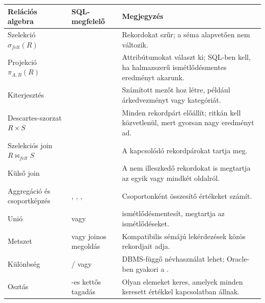 \begin{tabularx}{\textwidth}{L{25mm}L{43mm}X}
\toprule
\textbf{Relációs algebra} & \textbf{SQL-megfelelő} & \textbf{Megjegyzés} \\
\midrule
Szelekció $\sigma_{felt}(R)$ &  & Rekordokat szűr; a séma alapvetően nem változik. \\
Projekció $\pi_{A,B}(R)$ &  & Attribútumokat választ ki; SQL-ben  kell, ha halmazszerű ismétlődésmentes eredményt akarunk. \\
Kiterjesztés &  & Számított mezőt hoz létre, például árkedvezményt vagy kategóriát. \\
Descartes-szorzat $R \times S$ &  & Minden rekordpárt előállít; ritkán kell közvetlenül, mert gyorsan nagy eredményt ad. \\
Szelekciós join $R \bowtie_{felt} S$ &  & A kapcsolódó rekordpárokat tartja meg. \\
Külső join &  & A nem illeszkedő rekordokat is megtartja az egyik vagy mindkét oldalról. \\
Aggregáció és csoportképzés & , , ,  & Csoportonként összesítő értékeket számít. \\
Unió &  vagy  &  ismétlődésmentesít,  megtartja az ismétlődéseket. \\
Metszet &  vagy joinos megoldás & Kompatibilis sémájú lekérdezések közös rekordjait adja. \\
Különbség &  /  vagy  & DBMS-függő névhasználat lehet; Oracle-ben gyakori a . \\
Osztás & -es kettős tagadás & Olyan elemeket keres, amelyek minden keresett értékkel kapcsolatban állnak. \\
\bottomrule
\end{tabularx}
